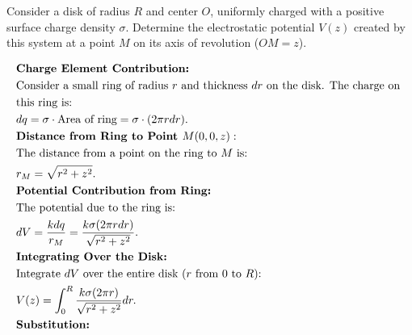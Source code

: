 \documentclass[12pt]{article}
\begin{document}
\section{}
Consider a disk of radius $ R $ and center $ O $, uniformly charged with a positive surface charge density $ \sigma $. Determine the electrostatic potential $ V(z) $ created by this system at a point $ M $ on its axis of revolution ($ OM = z $).

\begin{correctionbox}
	\begin{align*}
		 & \textbf{Charge Element Contribution:}                                                                   \\
		 & \text{Consider a small ring of radius } r \text{ and thickness } dr \text{ on the disk. The charge on } \\
		 & \text{this ring is:}                                                                                    \\
		 & dq = \sigma \cdot \text{Area of ring} = \sigma \cdot (2 \pi r dr).
		\\
		 & \textbf{Distance from Ring to Point } M(0, 0, z):                                                       \\
		 & \text{The distance from a point on the ring to } M \text{ is:}                                          \\
		 & r_M = \sqrt{r^2 + z^2}.
		\\
		 & \textbf{Potential Contribution from Ring:}                                                              \\
		 & \text{The potential due to the ring is:}                                                                \\
		 & dV = \frac{k dq}{r_M} = \frac{k \sigma (2 \pi r dr)}{\sqrt{r^2 + z^2}}.
		\\
		 & \textbf{Integrating Over the Disk:}                                                                     \\
		 & \text{Integrate } dV \text{ over the entire disk ($ r $ from $ 0 $ to $ R $):}                          \\
		 & V(z) = \int_0^R \frac{k \sigma (2 \pi r)}{\sqrt{r^2 + z^2}} dr.
		\\
		 & \textbf{Substitution:}                                                                                  \\

\end{align*}
\end{correctionbox}
\end{document}
